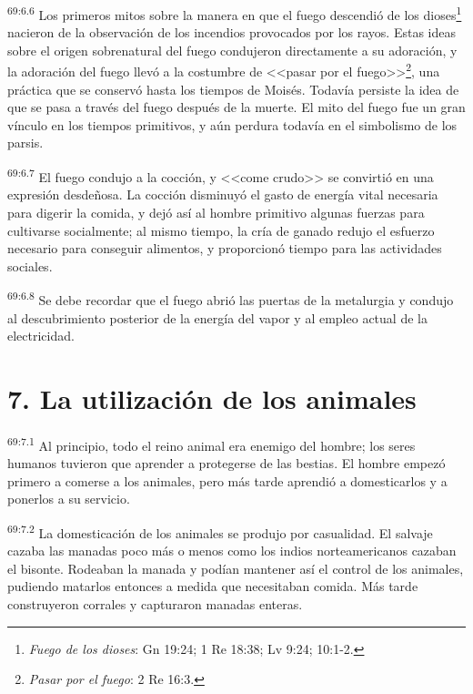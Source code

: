 \par
\textsuperscript{69:6.6} Los primeros mitos sobre la manera en que el fuego descendió de los dioses\footnote{\textit{Fuego de los dioses}: Gn 19:24; 1 Re 18:38; Lv 9:24; 10:1-2.} nacieron de la observación de los incendios provocados por los rayos. Estas ideas sobre el origen sobrenatural del fuego condujeron directamente a su adoración, y la adoración del fuego llevó a la costumbre de <<pasar por el fuego>>\footnote{\textit{Pasar por el fuego}: 2 Re 16:3.}, una práctica que se conservó hasta los tiempos de Moisés. Todavía persiste la idea de que se pasa a través del fuego después de la muerte. El mito del fuego fue un gran vínculo en los tiempos primitivos, y aún perdura todavía en el simbolismo de los parsis.

\par
\textsuperscript{69:6.7} El fuego condujo a la cocción, y <<come crudo>> se convirtió en una expresión desdeñosa. La cocción disminuyó el gasto de energía vital necesaria para digerir la comida, y dejó así al hombre primitivo algunas fuerzas para cultivarse socialmente; al mismo tiempo, la cría de ganado redujo el esfuerzo necesario para conseguir alimentos, y proporcionó tiempo para las actividades sociales.

\par
\textsuperscript{69:6.8} Se debe recordar que el fuego abrió las puertas de la metalurgia y condujo al descubrimiento posterior de la energía del vapor y al empleo actual de la electricidad.

\section*{7. La utilización de los animales}
\par
\textsuperscript{69:7.1} Al principio, todo el reino animal era enemigo del hombre; los seres humanos tuvieron que aprender a protegerse de las bestias. El hombre empezó primero a comerse a los animales, pero más tarde aprendió a domesticarlos y a ponerlos a su servicio.

\par
\textsuperscript{69:7.2} La domesticación de los animales se produjo por casualidad. El salvaje cazaba las manadas poco más o menos como los indios norteamericanos cazaban el bisonte. Rodeaban la manada y podían mantener así el control de los animales, pudiendo matarlos entonces a medida que necesitaban comida. Más tarde construyeron corrales y capturaron manadas enteras.

